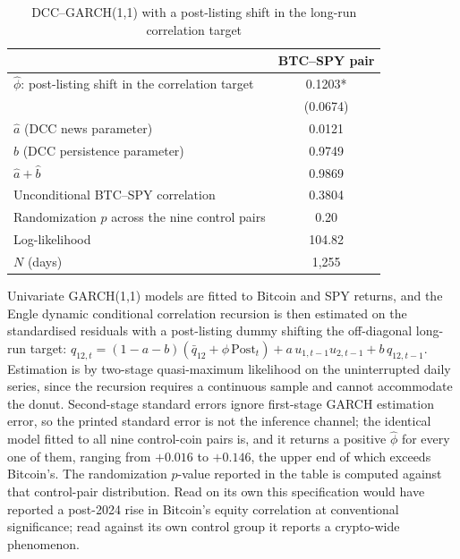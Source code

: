 \begin{table}[t]
\centering
\begin{threeparttable}
\caption{DCC--GARCH(1,1) with a post-listing shift in the long-run correlation target}
\label{tab:dcc}
\begin{tabular}{lc}
\toprule
 & BTC--SPY pair \\
\midrule
$\hat\phi$: post-listing shift in the correlation target & 0.1203* \\
 & (0.0674) \\
$\hat a$ (DCC news parameter) & 0.0121 \\
$\hat b$ (DCC persistence parameter) & 0.9749 \\
$\hat a + \hat b$ & 0.9869 \\
Unconditional BTC--SPY correlation & 0.3804 \\
Randomization $p$ across the nine control pairs & 0.20 \\
Log-likelihood & 104.82 \\
$N$ (days) & 1,255 \\
\bottomrule
\end{tabular}
\begin{tablenotes}[flushleft]
\footnotesize
\item Univariate GARCH(1,1) models are fitted to Bitcoin and SPY returns, and the Engle dynamic conditional correlation recursion is then estimated on the standardised residuals with a post-listing dummy shifting the off-diagonal long-run target: $q_{12,t} = (1-a-b)(\bar q_{12} + \phi\,\mathrm{Post}_t) + a\,u_{1,t-1}u_{2,t-1} + b\,q_{12,t-1}$. Estimation is by two-stage quasi-maximum likelihood on the uninterrupted daily series, since the recursion requires a continuous sample and cannot accommodate the donut. Second-stage standard errors ignore first-stage GARCH estimation error, so the printed standard error is not the inference channel; the identical model fitted to all nine control-coin pairs is, and it returns a positive $\hat\phi$ for every one of them, ranging from $+0.016$ to $+0.146$, the upper end of which exceeds Bitcoin's. The randomization $p$-value reported in the table is computed against that control-pair distribution. Read on its own this specification would have reported a post-2024 rise in Bitcoin's equity correlation at conventional significance; read against its own control group it reports a crypto-wide phenomenon.
\end{tablenotes}
\end{threeparttable}
\end{table}
